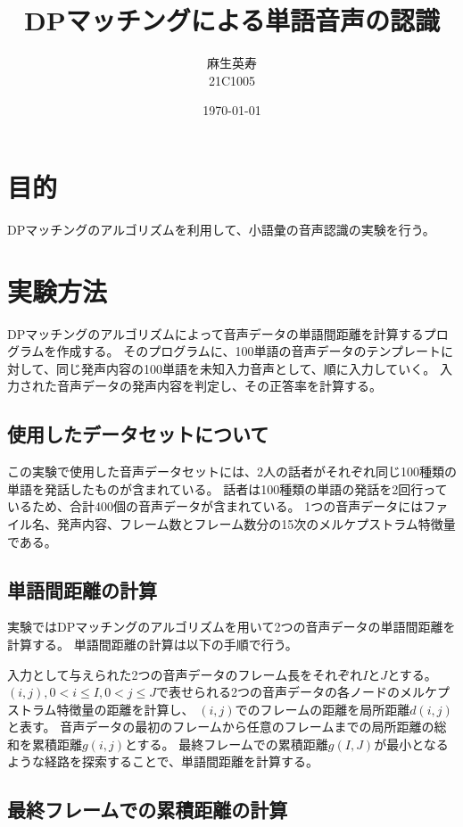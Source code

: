 \documentclass[a4paper,12pt]{article}
\title{DPマッチングによる単語音声の認識}
\author{麻生英寿 \\ 21C1005}
\date{\today}
\begin{document}
\maketitle

\tableofcontents

\section{目的}

DPマッチングのアルゴリズムを利用して、小語彙の音声認識の実験を行う。

\section{実験方法}

DPマッチングのアルゴリズムによって音声データの単語間距離を計算するプログラムを作成する。
そのプログラムに、100単語の音声データのテンプレートに対して、同じ発声内容の100単語を未知入力音声として、順に入力していく。
入力された音声データの発声内容を判定し、その正答率を計算する。

\subsection{使用したデータセットについて}

この実験で使用した音声データセットには、2人の話者がそれぞれ同じ100種類の単語を発話したものが含まれている。
話者は100種類の単語の発話を2回行っているため、合計400個の音声データが含まれている。
1つの音声データにはファイル名、発声内容、フレーム数とフレーム数分の15次のメルケプストラム特徴量である。

\subsection{単語間距離の計算}

実験ではDPマッチングのアルゴリズムを用いて2つの音声データの単語間距離を計算する。
単語間距離の計算は以下の手順で行う。

入力として与えられた2つの音声データのフレーム長をそれぞれ$I$と$J$とする。
$(i,j),0<i\leq I ,0<j\leq J$で表せられる2つの音声データの各ノードのメルケプストラム特徴量の距離を計算し、
$(i,j)$でのフレームの距離を局所距離$d(i,j)$と表す。
音声データの最初のフレームから任意のフレームまでの局所距離の総和を累積距離$g(i,j)$とする。
最終フレームでの累積距離$g(I,J)$が最小となるような経路を探索することで、単語間距離を計算する。

\subsection{最終フレームでの累積距離の計算}
\end{document}
